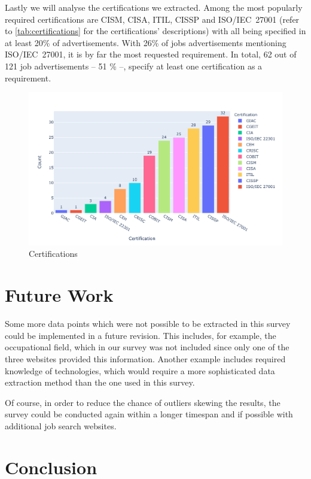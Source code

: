 \documentclass[runningheads]{llncs}
\begin{document}
Lastly we will analyse the certifications we extracted. Among the most popularly required certifications are CISM, CISA, ITIL, CISSP and ISO/IEC~27001 (refer to \autoref{tab:certifications} for the certifications' descriptions) with all being specified in at least 20\% of advertisements. With 26\% of jobs advertisements mentioning ISO/IEC~27001, it is by far the most requested requirement. In total, 62 out of 121 job advertisements -- 51 \% --, specify at least one certification as a requirement.

\begin{figure}[H]
	\centering
  \includegraphics[width=\textwidth]{certifications-bar-chart.pdf}
	\caption{Certifications}
	\label{fig:certifications_chart}
\end{figure}

\section{Future Work}
\label{sec:future_work}

Some more data points which were not possible to be extracted in this survey could be implemented in a future revision. This includes, for example, the occupational field, which in our survey was not included since only one of the three websites provided this information. Another example includes required knowledge of technologies, which would require a more sophisticated data extraction method than the one used in this survey.

Of course, in order to reduce the chance of outliers skewing the results, the survey could be conducted again within a longer timespan and if possible with additional job search websites.

\section{Conclusion}
\label{sec:conclusion}
\end{document}
